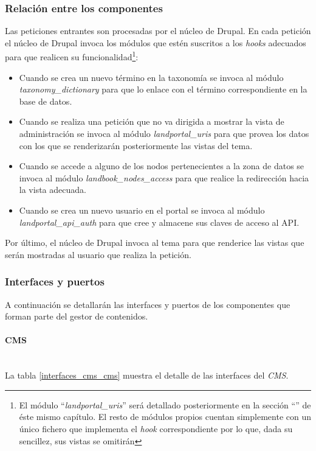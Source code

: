 \subsubsection{Relación entre los componentes}
Las peticiones entrantes son procesadas por el núcleo de Drupal.  En cada petición el núcleo de Drupal invoca los módulos que estén suscritos a los \textit{hooks} adecuados para que realicen su funcionalidad\footnote{El módulo ``\textit{landportal\_uris}'' será detallado posteriormente en la sección ``'' de éste mismo capítulo.  El resto de módulos propios cuentan simplemente con un único fichero que implementa el \textit{hook} correspondiente por lo que, dada su sencillez, sus vistas se omitirán}:
\begin{itemize}
	\item Cuando se crea un nuevo término en la taxonomía se invoca al módulo \textit{taxonomy\_dictionary} para que lo enlace con el término correspondiente en la base de datos.
	\item Cuando se realiza una petición que no va dirigida a mostrar la vista de administración se invoca al módulo \textit{landportal\_uris} para que provea los datos con los que se renderizarán posteriormente las vistas del tema.
	\item Cuando se accede a alguno de los nodos pertenecientes a la zona de datos se invoca al módulo \textit{landbook\_nodes\_access} para que realice la redirección hacia la vista adecuada.
	\item Cuando se crea un nuevo usuario en el portal se invoca al módulo \textit{landportal\_api\_auth} para que cree y almacene sus claves de acceso al API.
\end{itemize}
Por último, el núcleo de Drupal invoca al tema para que renderice las vistas que serán mostradas al usuario que realiza la petición.


\subsubsection{Interfaces y puertos}
A continuación se detallarán las interfaces y puertos de los componentes que forman parte del gestor de contenidos. 

\paragraph{CMS} \hfill \\
La tabla \ref{interfaces_cms_cms} muestra el detalle de las interfaces del \textit{CMS}.

